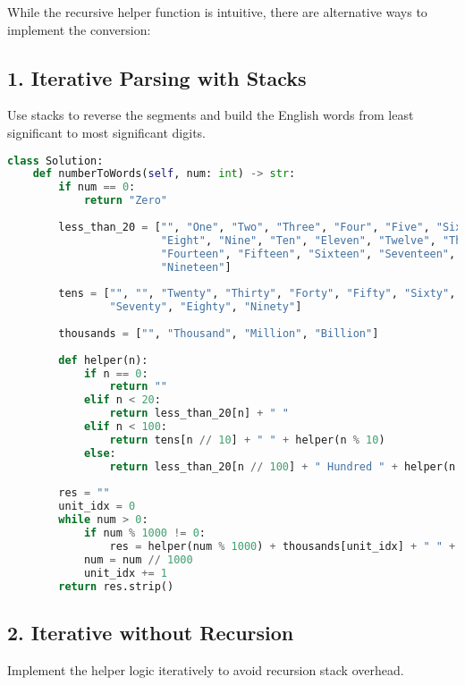 While the recursive helper function is intuitive, there are alternative ways to implement the conversion:

\subsection*{1. Iterative Parsing with Stacks}

Use stacks to reverse the segments and build the English words from least significant to most significant digits.

\begin{lstlisting}[language=Python]
class Solution:
    def numberToWords(self, num: int) -> str:
        if num == 0:
            return "Zero"
        
        less_than_20 = ["", "One", "Two", "Three", "Four", "Five", "Six", "Seven",
                        "Eight", "Nine", "Ten", "Eleven", "Twelve", "Thirteen",
                        "Fourteen", "Fifteen", "Sixteen", "Seventeen", "Eighteen",
                        "Nineteen"]
        
        tens = ["", "", "Twenty", "Thirty", "Forty", "Fifty", "Sixty",
                "Seventy", "Eighty", "Ninety"]
        
        thousands = ["", "Thousand", "Million", "Billion"]
        
        def helper(n):
            if n == 0:
                return ""
            elif n < 20:
                return less_than_20[n] + " "
            elif n < 100:
                return tens[n // 10] + " " + helper(n % 10)
            else:
                return less_than_20[n // 100] + " Hundred " + helper(n % 100)
        
        res = ""
        unit_idx = 0
        while num > 0:
            if num % 1000 != 0:
                res = helper(num % 1000) + thousands[unit_idx] + " " + res
            num = num // 1000
            unit_idx += 1
        return res.strip()
\end{lstlisting}

\subsection*{2. Iterative without Recursion}

Implement the helper logic iteratively to avoid recursion stack overhead.

